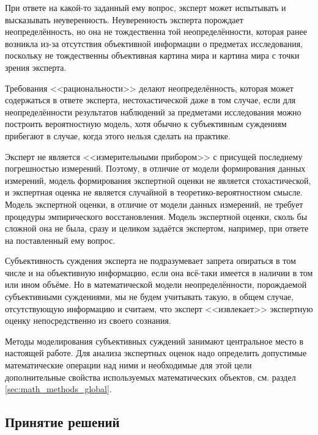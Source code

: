 При ответе на какой-то заданный ему вопрос, эксперт может испытывать и высказывать неуверенность. Неуверенность эксперта  порождает неопределённость, но она не тождественна той неопределённости, которая ранее возникла из-за отсутствия объективной информации о предметах исследования, поскольку не тождественны объективная картина мира и картина мира с точки зрения эксперта. 

Требования <<рациональности>> делают неопределённость, которая может содержаться в ответе эксперта, нестохастической даже в том случае, если для неопределённости результатов наблюдений за предметами исследования можно построить вероятностную модель, хотя обычно к субъективным суждениям прибегают в случае, когда этого нельзя сделать на практике. 

Эксперт не является <<измерительными прибором>> с присущей последнему погрешностью измерений. Поэтому, в отличие от модели формирования данных измерений, модель формирования экспертной оценки не является стохастической, и экспертная оценка не является случайной в теоретико-вероятностном смысле. Модель экспертной оценки, в отличие от модели данных измерений, не требует процедуры эмпирического восстановления. Модель экспертной оценки, сколь бы сложной она не была, сразу и целиком задаётся экспертом, например, при ответе на поставленный ему вопрос.
 
Субъективность суждения эксперта не подразумевает запрета опираться в том числе и на объективную информацию, если она всё-таки имеется в наличии в том или ином объёме. Но в математической модели неопределённости, порождаемой субъективными суждениями, мы не будем учитывать такую, в общем случае, отсутствующую информацию и считаем, что эксперт <<извлекает>> экспертную оценку непосредственно из своего сознания. 

Методы моделирования субъективных суждений занимают центральное место в настоящей работе. Для анализа экспертных оценок надо определить допустимые математические операции над ними и необходимые для этой цели дополнительные свойства используемых математических объектов, см. раздел \ref{sec:math_methods_global}. 

\subsection{Принятие решений}

